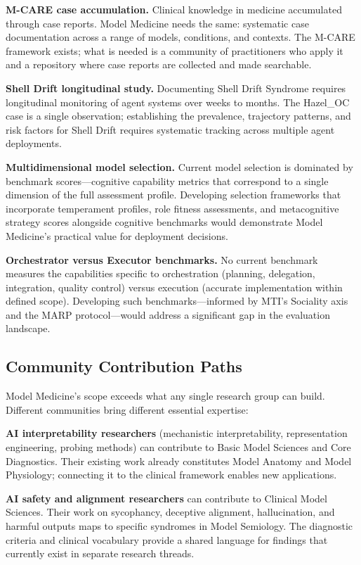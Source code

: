 \documentclass[11pt]{article}
\begin{document}
\textbf{M-CARE case accumulation.} Clinical knowledge in medicine accumulated through case reports. Model Medicine needs the same: systematic case documentation across a range of models, conditions, and contexts. The M-CARE framework exists; what is needed is a community of practitioners who apply it and a repository where case reports are collected and made searchable.

\textbf{Shell Drift longitudinal study.} Documenting Shell Drift Syndrome requires longitudinal monitoring of agent systems over weeks to months. The Hazel\_OC case is a single observation; establishing the prevalence, trajectory patterns, and risk factors for Shell Drift requires systematic tracking across multiple agent deployments.

\textbf{Multidimensional model selection.} Current model selection is dominated by benchmark scores---cognitive capability metrics that correspond to a single dimension of the full assessment profile. Developing selection frameworks that incorporate temperament profiles, role fitness assessments, and metacognitive strategy scores alongside cognitive benchmarks would demonstrate Model Medicine's practical value for deployment decisions.

\textbf{Orchestrator versus Executor benchmarks.} No current benchmark measures the capabilities specific to orchestration (planning, delegation, integration, quality control) versus execution (accurate implementation within defined scope). Developing such benchmarks---informed by MTI's Sociality axis and the MARP protocol---would address a significant gap in the evaluation landscape.

\subsection{Community Contribution Paths}

Model Medicine's scope exceeds what any single research group can build. Different communities bring different essential expertise:

\textbf{AI interpretability researchers} (mechanistic interpretability, representation engineering, probing methods) can contribute to Basic Model Sciences and Core Diagnostics. Their existing work already constitutes Model Anatomy and Model Physiology; connecting it to the clinical framework enables new applications.

\textbf{AI safety and alignment researchers} can contribute to Clinical Model Sciences. Their work on sycophancy, deceptive alignment, hallucination, and harmful outputs maps to specific syndromes in Model Semiology. The diagnostic criteria and clinical vocabulary provide a shared language for findings that currently exist in separate research threads.
\end{document}
